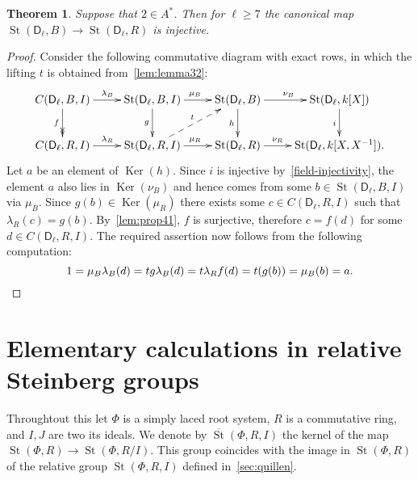 \documentclass[oneside, 8pt]{amsart}
\newtheorem{theorem}{Theorem}
\theoremstyle{remark}
\theoremstyle{definition}
\numberwithin{lemma}{section}
\numberwithin{prop}{section}
\numberwithin{corollary}{section}
\DeclareMathOperator{\Ker}{Ker}
\DeclareMathOperator{\St}{St}
\newcommand{\rD}{\mathsf{D}}
\numberwithin{equation}{section}
\begin{document}
\begin{theorem} \label{thm41}
Suppose that $2 \in A^*$. Then for $\ell \geq 7$ the canonical map $\St(\rD_\ell, B) \to \St(\rD_\ell, R)$ is injective.
\end{theorem}
\begin{proof}
 Consider the following commutative diagram with exact rows, in which the lifting $t$ is obtained from~\cref{lem:lemma32}:
\begin{equation*} \xymatrix{
 C(\rD_\ell, B, I) \ar[r]^{\lambda_B} \ar@{->>}[d]_{f} & \St(\rD_\ell, B, I) \ar[r]^{\mu_B} \ar[d]_{g} &
 \St(\rD_\ell, B) \ar[r]^{\nu_B} \ar[d]_{h} & \St(\rD_\ell, k[X]) \ar[d]_{i} \\
 C(\rD_\ell, R, I) \ar[r]^{\lambda_R}         & \St(\rD_\ell, R, I) \ar[r]^{\mu_R} \ar@{-->}[ur]^{t}&
 \St(\rD_\ell, R) \ar[r]^-{\nu_R}        & \St(\rD_\ell, k[X, X^{-1}]).
}\end{equation*}
Let $a$ be an element of $\Ker(h)$. Since $i$ is injective by~\cref{field-injectivity}, the element $a$
 also lies in $\Ker(\nu_B)$ and hence comes from some $b \in \St(\rD_\ell, B, I)$ via $\mu_B$.
Since $g(b) \in \Ker(\mu_R)$ there exists some $c \in C(\rD_\ell, R, I)$ such that $\lambda_R(c) = g(b)$. 
By~\cref{lem:prop41}, $f$ is surjective, therefore $c = f(d)$ for some $d \in C(\rD_\ell, R, I)$.
The required assertion now follows from the following computation:
 \[ 1 = \mu_B\lambda_B(d) = tg\lambda_B(d) = t\lambda_Rf(d) =t(g(b)) = \mu_B(b) = a. \qedhere \]
\end{proof}

\section{Elementary calculations in relative Steinberg groups}
\begin{comment}
Hall-Witt identity
\[ [[ y^{-1}, x], z] ^ {y^{-1}}  [[ z^{-1}, y], x] ^ {z^{-1}}  [[ x^{-1}, z], y] ^ {x^{-1}} = 1 \]
\[ [[ y^{-1}, x], z]  \cdot [[ z^{-1}, y], x] ^ {z^{-1}y} \cdot  [[ x^{-1}, z], y] ^ {x^{-1}y} = 1. \]
\[ [[ z^{-1}, y^{-1}], x] ^ {z^{-1}y^{-1}} \cdot  [[ x^{-1}, z], y^{-1}] ^ {x^{-1}y^{-1}} = [z, [ y, x]] . \]
\[  . \]
\end{comment}
Throughtout this let $\Phi$ is a simply laced root system, $R$ is a commutative ring, and $I, J$ are two its ideals. 
We denote by $\overline{\St}(\Phi, R, I)$ the kernel of the map $\St(\Phi, R) \to \St(\Phi, R/I)$.
This group coincides with the image in $\St(\Phi, R)$ of the relative group $\St(\Phi, R, I)$ defined in~\cref{sec:quillen}.
\end{document}
